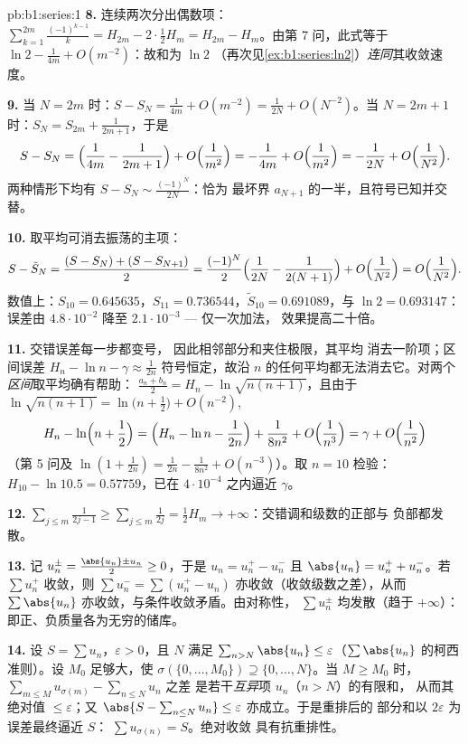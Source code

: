 \begin{solution}{pb:b1:series:1}
\textbf{8.} 连续两次分出偶数项：
$\sum_{k=1}^{2m}\frac{(-1)^{k-1}}{k} = H_{2m} - 2\cdot\frac12
H_m = H_{2m} - H_m$。由第 7 问，此式等于 $\ln 2 -
\frac{1}{4m} + O(m^{-2})$：故和为 $\ln 2$
（再次见\cref{ex:b1:series:ln2}）\emph{连同}其收敛速度。

\textbf{9.} 当 $N = 2m$ 时：$S - S_N = \frac{1}{4m} + O(m^{-2}) =
\frac{1}{2N} + O(N^{-2})$。当 $N = 2m + 1$ 时：$S_{N} = S_{2m} +
\frac{1}{2m+1}$，于是
\[
S - S_N = \Bigl(\frac{1}{4m} - \frac{1}{2m+1}\Bigr) +
O\Bigl(\frac{1}{m^2}\Bigr)
= -\frac{1}{4m} + O\Bigl(\frac{1}{m^2}\Bigr)
= -\frac{1}{2N} + O\Bigl(\frac{1}{N^2}\Bigr).
\]
两种情形下均有 $S - S_N \sim \frac{(-1)^N}{2N}$：恰为
最坏界 $a_{N+1}$ 的一半，且符号已知并交替。

\textbf{10.} 取平均可消去振荡的主项：
\[
S - \tilde S_N = \frac{(S - S_N) + (S - S_{N+1})}{2}
= \frac{(-1)^N}{2}\Bigl(\frac{1}{2N} - \frac{1}{2(N+1)}\Bigr)
+ O\Bigl(\frac{1}{N^2}\Bigr) = O\Bigl(\frac{1}{N^2}\Bigr).
\]
数值上：$S_{10} = 0.645635$，$S_{11} = 0.736544$，$\tilde
S_{10} = 0.691089$，与 $\ln 2 = 0.693147$：误差由
$4.8\cdot10^{-2}$ 降至 $2.1\cdot10^{-3}$ --- 仅一次加法，
效果提高二十倍。

\textbf{11.} 交错误差每一步都变号，
因此相邻部分和夹住极限，其平均
消去一阶项；区间误差 $H_n - \ln n -
\gamma \approx \frac{1}{2n}$ 符号恒定，故沿
$n$ 的任何平均都无法消去它。对两个\emph{区间}取平均确有帮助：
$\frac{a_n + b_n}{2} = H_n - \ln\sqrt{n(n+1)}$，且由于
$\ln\sqrt{n(n+1)} = \ln\bigl(n + \frac12\bigr) + O(n^{-2})$,
\[
H_n - \ln\Bigl(n + \frac12\Bigr)
= \Bigl(H_n - \ln n - \frac{1}{2n}\Bigr) + \frac{1}{8n^2} +
O\Bigl(\frac{1}{n^3}\Bigr) = \gamma + O\Bigl(\frac{1}{n^2}\Bigr)
\]
（第 5 问及 $\ln(1 + \frac{1}{2n}) = \frac{1}{2n} -
\frac{1}{8n^2} + O(n^{-3})$）。取 $n = 10$ 检验：$H_{10} -
\ln 10.5 = 0.57759$，已在
$4\cdot10^{-4}$ 之内逼近 $\gamma$。

\textbf{12.} $\sum_{j\leq m} \frac{1}{2j-1} \geq \sum_{j \leq m}
\frac{1}{2j} = \frac12 H_m \to +\infty$：交错调和级数的正部与
负部都发散。

\textbf{13.} 记 $u_n^\pm = \frac{\abs{u_n} \pm u_n}{2} \geq
0$，于是 $u_n = u_n^+ - u_n^-$ 且 $\abs{u_n} = u_n^+ + u_n^-$。若
$\sum u_n^+$ 收敛，则 $\sum u_n^- = \sum (u_n^+ - u_n)$
亦收敛（收敛级数之差），从而 $\sum
\abs{u_n}$ 亦收敛，与条件收敛矛盾。由对称性，
$\sum u_n^\pm$ 均发散（趋于 $+\infty$）：
即正、负质量各为无穷的储库。

\textbf{14.} 设 $S = \sum u_n$，$\varepsilon > 0$，且 $N$ 满足
$\sum_{n > N} \abs{u_n} \leq \varepsilon$（$\sum\abs{u_n}$ 的柯西
准则）。设 $M_0$ 足够大，使 $\sigma(\{0,
\dots, M_0\}) \supseteq \{0, \dots, N\}$。当 $M \geq M_0$ 时，
$\sum_{m \leq M} u_{\sigma(m)} - \sum_{n \leq N} u_n$ 之差
是若干\emph{互异}项 $u_n$（$n > N$）的有限和，
从而其绝对值 $\leq \varepsilon$；又 $\abs{S -
\sum_{n\leq N} u_n} \leq \varepsilon$ 亦成立。于是重排后的
部分和以 $2\varepsilon$ 为误差最终逼近 $S$：
$\sum u_{\sigma(n)} = S$。绝对收敛
具有抗重排性。


\end{solution}
